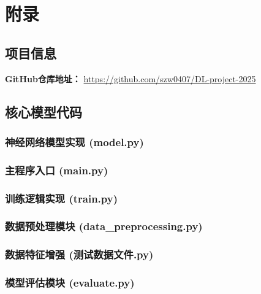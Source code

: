 \documentclass{article}
\begin{document}
\appendix
\section{附录}

\subsection{项目信息}
\textbf{GitHub仓库地址：} \url{https://github.com/szw0407/DL-project-2025}

\subsection{核心模型代码}
\subsubsection{神经网络模型实现 (model.py)}


\subsubsection{主程序入口 (main.py)}


\subsubsection{训练逻辑实现 (train.py)}


\subsubsection{数据预处理模块 (data\_preprocessing.py)}


\subsubsection{数据特征增强 (测试数据文件.py)}


\subsubsection{模型评估模块 (evaluate.py)}

\end{document}
